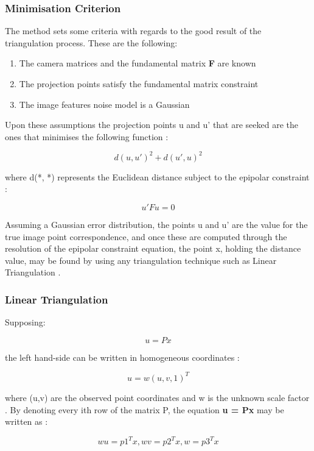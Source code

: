 \subsubsection{Minimisation Criterion}

The method sets some criteria with regards to the good result of the triangulation process. These are the following:

\begin{enumerate}
  \item The camera matrices and the fundamental matrix \textbf{F} are known
  \item The projection points satisfy the fundamental matrix constraint
  \item The image features noise model is a Gaussian
\end{enumerate}

Upon these assumptions the projection points u and u' that are seeked are the ones that minimises the following function \cite{hartley1997triangulation}:

\[d(u, u')^2 + d(u', u)^2\]

where d(*, *) represents the Euclidean distance subject to the epipolar constraint \cite{hartley1997triangulation}:

\[u'Fu = 0\]

Assuming a Gaussian error distribution, the points u and u' are the value for the true image point correspondence, and once these are computed through the resolution of the epipolar constraint equation, the point x, holding the distance value,  may be found by using any triangulation technique such as Linear Triangulation \cite{hartley1997triangulation}.

\subsubsection{Linear Triangulation}

Supposing:

\[u = Px\]

the left hand-side can be written in homogeneous coordinates \cite{hartley1997triangulation}:

\[u = w(u, v, 1)^T\]

where (u,v) are the observed point coordinates and w is the unknown scale factor \cite{hartley1997triangulation}. By denoting every ith row of the matrix P, the equation \textbf{u = Px} may be written as \cite{hartley1997triangulation}:

\[wu = p1^Tx, wv = p2^Tx, w = p3^Tx\]

